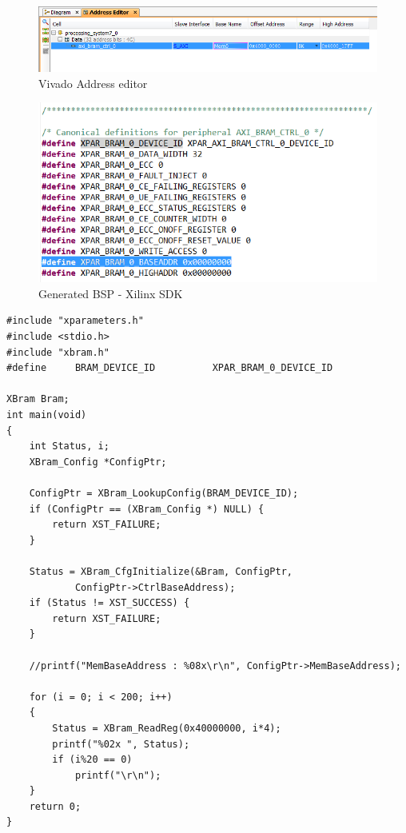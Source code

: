 \documentclass[10pt,a4paper, oneside]{memoir}
\begin{document}
\begin{figure}
\centering
\includegraphics[scale=.4, keepaspectratio]{images/vivado_address_editor_mem_ctl}
\caption{Vivado Address editor}
\label{fig:vivado_address_editor_mem_ctl}
\end{figure}

\begin{figure}
\centering
\includegraphics[scale=1, keepaspectratio]{images/sdk_bsp_bram}
\caption{Generated BSP - Xilinx SDK}
\label{fig:sdk_bsp_bram}
\end{figure}


\begin{lstlisting}
#include "xparameters.h"
#include <stdio.h>
#include "xbram.h"
#define 	BRAM_DEVICE_ID 			XPAR_BRAM_0_DEVICE_ID

XBram Bram;
int main(void)
{
	int Status, i;
	XBram_Config *ConfigPtr;

	ConfigPtr = XBram_LookupConfig(BRAM_DEVICE_ID);
	if (ConfigPtr == (XBram_Config *) NULL) {
		return XST_FAILURE;
	}

	Status = XBram_CfgInitialize(&Bram, ConfigPtr,
			ConfigPtr->CtrlBaseAddress);
	if (Status != XST_SUCCESS) {
		return XST_FAILURE;
	}

	//printf("MemBaseAddress : %08x\r\n", ConfigPtr->MemBaseAddress);

	for (i = 0; i < 200; i++)
	{
		Status = XBram_ReadReg(0x40000000, i*4);
		printf("%02x ", Status);
		if (i%20 == 0)
			printf("\r\n");
	}
	return 0;
}
\end{lstlisting}
\end{document}
